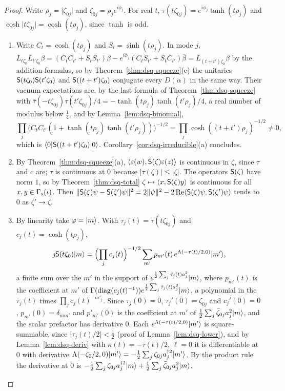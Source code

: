 \begin{veteenv}
\begin{proof}
Write $\rho_j=\lvert\zeta_{0j}\rvert$ and $\zeta_{0j}=\rho_je^{i\phi_j}$. For real $t$, $\tau(t\zeta_{0j})=e^{i\phi_j}\tanh(t\rho_j)$ and
$\cosh\lvert t\zeta_{0j}\rvert=\cosh(t\rho_j)$, since $\tanh$ is odd.
\begin{enumerate}
\item[(a)] Write $C_t=\cosh(t\rho_j)$ and $S_t=\sinh(t\rho_j)$. In mode $j$, $L_{t\zeta_0}L_{t'\zeta_0}\beta=(C_tC_{t'}+S_tS_{t'})\beta-
e^{i\phi_j}(C_tS_{t'}+S_tC_{t'})\bar\beta=L_{(t+t')\zeta_0}\beta$ by the addition formulas, so by Theorem~\ref{thm:dsq-squeeze}(c) the
unitaries $\mathsf S(t\zeta_0)\mathsf S(t'\zeta_0)$ and $\mathsf S((t+t')\zeta_0)$ conjugate every $D(\alpha)$ in the same way. Their vacuum expectations
are, by the last formula of Theorem~\ref{thm:dsq-squeeze} with $\bar\tau(-t\zeta_{0j})\tau(t'\zeta_{0j})/4=-\tanh(t\rho_j)\tanh(t'\rho_j)/4$, a
real number of modulus below $\frac14$, and by Lemma~\ref{lem:dsq-binomial},
\[
 \prod_j\bigl(C_tC_{t'}(1+\tanh(t\rho_j)\tanh(t'\rho_j))\bigr)^{-1/2}=\prod_j\cosh((t+t')\rho_j)^{-1/2}\ne0,
\]
which is $\langle0\rvert\mathsf S((t+t')\zeta_0)\lvert 0\rangle$. Corollary~\ref{cor:dsq-irreducible}(a) concludes.
\item[(b)] By Theorem~\ref{thm:dsq-squeeze}(a), $\langle\varepsilon(w),\mathsf S(\zeta)\varepsilon(z)\rangle$ is continuous in $\zeta$, since $\tau$ and
$c$ are; $\tau$ is continuous at $0$ because $\lvert\tau(\zeta)\rvert\le\lvert\zeta\rvert$. The operators $\mathsf S(\zeta)$ have norm $1$, so by
Theorem~\ref{thm:dsq-total} $\zeta\mapsto\langle x,\mathsf S(\zeta)y\rangle$ is continuous for all $x,y\in\Gamma_s(\iota)$. Then
$\lVert\mathsf S(\zeta)\psi-\mathsf S(\zeta')\psi\rVert^2=2\lVert\psi\rVert^2-2\operatorname{Re}\langle\mathsf S(\zeta)\psi,\mathsf S(\zeta')\psi\rangle$ tends to $0$ as $\zeta'\to\zeta$.
\item[(c)] By linearity take $\varphi=\lvert m\rangle$. With $\tau_j(t)=\tau(t\zeta_{0j})$ and $c_j(t)=\cosh(t\rho_j)$,
\[
 \jmath\mathsf S(t\zeta_0)\lvert m\rangle=\Bigl(\prod_jc_j(t)\Bigr)^{-1/2}\sum_{m'}p_{m'}(t)\,e^{\Lambda(-\tau(t)/2,0)}\lvert m'\rangle,
\]
a finite sum over the $m'$ in the support of $e^{\frac12\sum_j\bar\tau_j(t)a_j^2}\lvert m\rangle$, where $p_{m'}(t)$ is the coefficient at $m'$ of
$\Gamma(\operatorname{diag}(c_j(t)^{-1}))e^{\frac12\sum_j\bar\tau_j(t)a_j^2}\lvert m\rangle$, a polynomial in the $\bar\tau_j(t)$ times $\prod_jc_j(t)^{-m'_j}$. Since
$\tau_j(0)=0$, $\tau_j'(0)=\zeta_{0j}$ and $c_j'(0)=0$, $p_{m'}(0)=\delta_{mm'}$ and $p'_{m'}(0)$ is the coefficient at $m'$ of
$\frac12\sum_j\bar\zeta_{0j}a_j^2\lvert m\rangle$, and the scalar prefactor has derivative $0$. Each $e^{\Lambda(-\tau(t)/2,0)}\lvert m'\rangle$ is square-summable,
since $\lvert\tau_j(t)/2\rvert<\frac12$ (proof of Lemma~\ref{lem:dsq-lower}), and by Lemma~\ref{lem:dsq-deriv} with $\kappa(t)=-\tau(t)/2$,
$\ell=0$ it is differentiable at $0$ with derivative $\Lambda(-\zeta_0/2,0)\lvert m'\rangle=-\frac12\sum_j\zeta_{0j}a_j^{\dagger2}\lvert m'\rangle$. By the
product rule the derivative at $0$ is $-\frac12\sum_j\zeta_{0j}a_j^{\dagger2}\lvert m\rangle+\frac12\sum_j\bar\zeta_{0j}a_j^2\lvert m\rangle$.\qedhere
\end{enumerate}
\end{proof}


\end{veteenv}

